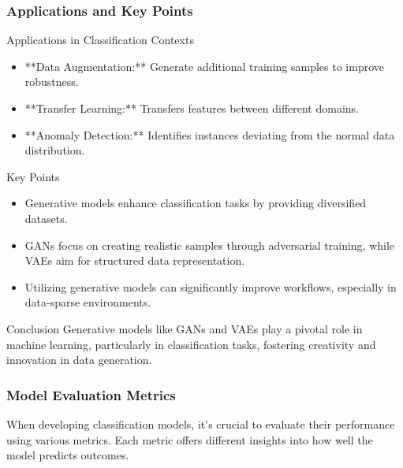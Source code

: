 \documentclass[aspectratio=169]{beamer}
\begin{document}
\begin{frame}[fragile]
    \frametitle{Applications and Key Points}
    \begin{block}{Applications in Classification Contexts}
        \begin{itemize}
            \item **Data Augmentation:** Generate additional training samples to improve robustness.
            \item **Transfer Learning:** Transfers features between different domains.
            \item **Anomaly Detection:** Identifies instances deviating from the normal data distribution.
        \end{itemize}
    \end{block}
    \begin{block}{Key Points}
        \begin{itemize}
            \item Generative models enhance classification tasks by providing diversified datasets.
            \item GANs focus on creating realistic samples through adversarial training, while VAEs aim for structured data representation.
            \item Utilizing generative models can significantly improve workflows, especially in data-sparse environments.
        \end{itemize}
    \end{block}
    \begin{block}{Conclusion}
        Generative models like GANs and VAEs play a pivotal role in machine learning, particularly in classification tasks, fostering creativity and innovation in data generation.
    \end{block}
\end{frame}

\begin{frame}[fragile]
    \frametitle{Model Evaluation Metrics}
    When developing classification models, it’s crucial to evaluate their performance using various metrics. Each metric offers different insights into how well the model predicts outcomes.
\end{frame}
\end{document}
